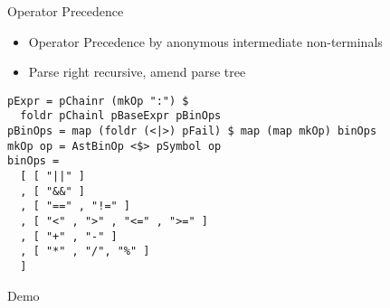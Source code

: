 \documentclass{beamer}
\begin{document}
\begin{frame}[fragile]{Operator Precedence}

\begin{itemize}
  \item Operator Precedence by anonymous intermediate non-terminals
  \item Parse right recursive, amend parse tree
\end{itemize}

\begin{verbatim}
pExpr = pChainr (mkOp ":") $
  foldr pChainl pBaseExpr pBinOps
pBinOps = map (foldr (<|>) pFail) $ map (map mkOp) binOps
mkOp op = AstBinOp <$> pSymbol op
binOps =
  [ [ "||" ]
  , [ "&&" ]
  , [ "==" , "!=" ]
  , [ "<" , ">" , "<=" , ">=" ]
  , [ "+" , "-" ]
  , [ "*" , "/", "%" ]
  ]
\end{verbatim}

\end{frame}


\begin{frame}{Demo}
\end{frame}
\end{document}
